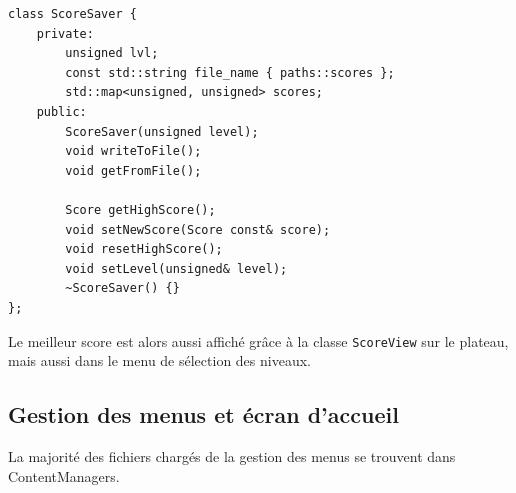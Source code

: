 \documentclass[a4paper, 12pt]{article}
\begin{document}
\begin{lstlisting}
class ScoreSaver {
    private:
        unsigned lvl;
        const std::string file_name { paths::scores };
        std::map<unsigned, unsigned> scores;
    public:
        ScoreSaver(unsigned level);
        void writeToFile();
        void getFromFile();

        Score getHighScore();
        void setNewScore(Score const& score);
        void resetHighScore();
        void setLevel(unsigned& level);
        ~ScoreSaver() {}
};
\end{lstlisting}

Le meilleur score est alors aussi affiché grâce à la classe \texttt{ScoreView} sur le plateau,
mais aussi dans le menu de sélection des niveaux.

\subsection{Gestion des menus et écran d'accueil}

La majorité des fichiers chargés de la gestion des menus se trouvent dans ContentManagers.
\end{document}
